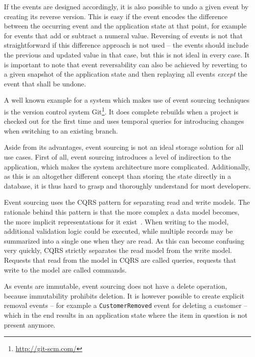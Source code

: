 If the events are designed accordingly, it is also possible to undo a given event by creating its reverse version.
This is easy if the event encodes the difference between the occurring event and the application state at that point, for example for events that add or subtract a numeral value.
Reversing of events is not that straightforward if this difference approach is not used -- the events should include the previous and updated value in that case, but this is not ideal in every case.
It is important to note that event reversability can also be achieved by reverting to a given snapshot of the application state and then replaying all events \emph{except} the event that shall be undone.

A well known example for a system which makes use of event sourcing techniques is the version control system Git\footnote{\url{http://git-scm.com/}}.
It does complete rebuilds when a project is checked out for the first time and uses temporal queries for introducing changes when switching to an existing branch.

Aside from its advantages, event sourcing is not an ideal storage solution for all use cases.
First of all, event sourcing introduces a level of indirection to the application, which makes the system architecture more complicated.
Additionally, as this is an altogether different concept than storing the state directly in a database, it is thus hard to grasp and thoroughly understand for most developers.

Event sourcing uses the \acf{CQRS} pattern for separating read and write models.
The rationale behind this pattern is that the more complex a data model becomes, the more implicit representations for it exist~\cite{WEB:Fowler:2011}.
When writing to the model, additional validation logic could be executed, while multiple records may be summarized into a single one when they are read.
As this can become confusing very quickly, \ac{CQRS} strictly separates the read model from the write model.
Requests that read from the model in \ac{CQRS} are called queries, requests that write to the model are called commands.


As events are immutable, event sourcing does not have a delete operation, because immutability prohibits deletion.
It is however possible to create explicit removal events -- for example a \texttt{CustomerRemoved} event for deleting a customer -- which in the end results in an application state where the item in question is not present anymore.

